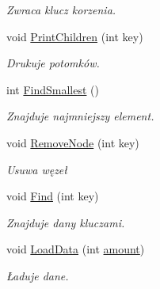 \begin{DoxyCompactItemize}
\begin{DoxyCompactList}\small\item\em \-Zwraca klucz korzenia. \end{DoxyCompactList}\item 
void \hyperlink{class_b_s_t_afc58989d868996fc3145897c76a773e0}{\-Print\-Children} (int key)
\begin{DoxyCompactList}\small\item\em \-Drukuje potomków. \end{DoxyCompactList}\item 
\hypertarget{class_b_s_t_acd20085d8f9cc25853a134a95650e286}{int \hyperlink{class_b_s_t_acd20085d8f9cc25853a134a95650e286}{\-Find\-Smallest} ()}\label{class_b_s_t_acd20085d8f9cc25853a134a95650e286}

\begin{DoxyCompactList}\small\item\em \-Znajduje najmniejszy element. \end{DoxyCompactList}\item 
\hypertarget{class_b_s_t_a4e9c64a0c0493df544dd62eb759565d0}{void \hyperlink{class_b_s_t_a4e9c64a0c0493df544dd62eb759565d0}{\-Remove\-Node} (int key)}\label{class_b_s_t_a4e9c64a0c0493df544dd62eb759565d0}

\begin{DoxyCompactList}\small\item\em \-Usuwa węzeł \end{DoxyCompactList}\item 
\hypertarget{class_b_s_t_a0ce14b99d6510b897082c9b2236c669b}{void \hyperlink{class_b_s_t_a0ce14b99d6510b897082c9b2236c669b}{\-Find} (int key)}\label{class_b_s_t_a0ce14b99d6510b897082c9b2236c669b}

\begin{DoxyCompactList}\small\item\em \-Znajduje dany kluczami. \end{DoxyCompactList}\item 
\hypertarget{class_b_s_t_a9b76ec89b7a782fda39ce48c199d5ce7}{void \hyperlink{class_b_s_t_a9b76ec89b7a782fda39ce48c199d5ce7}{\-Load\-Data} (int \hyperlink{class_b_s_t_aaf840095400a10e8442e38725fcde15c}{amount})}\label{class_b_s_t_a9b76ec89b7a782fda39ce48c199d5ce7}

\begin{DoxyCompactList}\small\item\em Ładuje dane. \end{DoxyCompactList}\end{DoxyCompactItemize}

